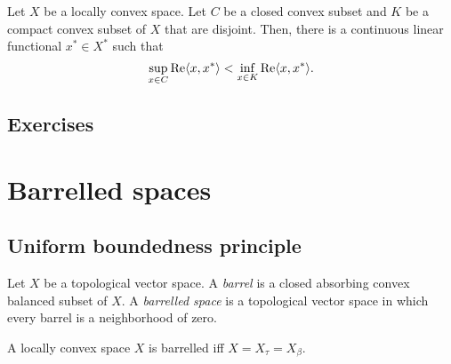 \documentclass{../../large}
\begin{document}
\begin{prb}

Let $X$ be a locally convex space.
Let $C$ be a closed convex subset and $K$ be a compact convex subset of $X$ that are disjoint.
Then, there is a continuous linear functional $x^*\in X^*$ such that
\[\sup_{x\in C}\operatorname{Re}\langle x,x^*\rangle<\inf_{x\in K}\operatorname{Re}\langle x,x^*\rangle.\]
\end{prb}





\section*{Exercises}
\begin{prb}
\end{prb}





\chapter{Barrelled spaces}

\section{Uniform boundedness principle}
\begin{prb}
Let $X$ be a topological vector space.
A \emph{barrel} is a closed absorbing convex balanced subset of $X$.
A \emph{barrelled space} is a topological vector space in which every barrel is a neighborhood of zero.
\end{prb}


A locally convex space $X$ is barrelled iff $X=X_\tau=X_\beta$.

\end{document}
